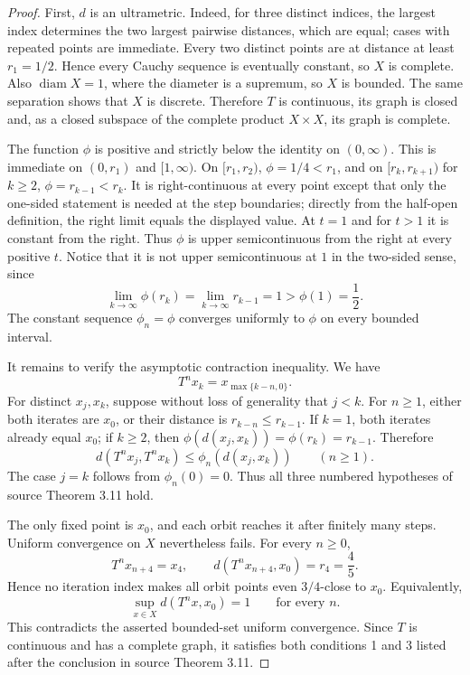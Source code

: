\documentclass[11pt]{article}
\begin{document}
\begin{proof}
First, $d$ is an ultrametric.  Indeed, for three distinct indices, the largest
index determines the two largest pairwise distances, which are equal; cases
with repeated points are immediate.  Every two distinct points are at
distance at least $r_1=1/2$.  Hence every Cauchy sequence is eventually
constant, so $X$ is complete.  Also $\operatorname{diam}X=1$, where the
diameter is a supremum, so $X$ is bounded.  The same separation shows that
$X$ is discrete.  Therefore $T$ is continuous, its graph is closed and,
as a closed subspace of the complete product $X\times X$, its graph is
complete.

The function $\phi$ is positive and strictly below the identity on
$(0,\infty)$.  This is immediate on $(0,r_1)$ and $[1,\infty)$.  On
$[r_1,r_2)$, $\phi=1/4<r_1$, and on
$[r_k,r_{k+1})$ for $k\geq2$, $\phi=r_{k-1}<r_k$.
It is right-continuous at every point except that only the one-sided statement
is needed at the step boundaries; directly from the half-open definition,
the right limit equals the displayed value.  At $t=1$ and for $t>1$ it is
constant from the right.  Thus $\phi$ is upper semicontinuous from the right
at every positive $t$.  Notice that it is not upper semicontinuous at $1$ in
the two-sided sense, since
\[
 \lim_{k\to\infty}\phi(r_k)
 =\lim_{k\to\infty}r_{k-1}=1>\phi(1)=\frac12.
\]
The constant sequence $\phi_n=\phi$ converges uniformly to $\phi$ on every
bounded interval.

It remains to verify the asymptotic contraction inequality.  We have
\[
 T^n x_k=x_{\max\{k-n,0\}}.
\]
For distinct $x_j,x_k$, suppose without loss of generality that $j<k$.
For $n\geq1$, either both iterates are $x_0$, or their distance is
$r_{k-n}\leq r_{k-1}$.  If $k=1$, both iterates already equal $x_0$;
if $k\geq2$, then $\phi(d(x_j,x_k))=\phi(r_k)=r_{k-1}$.  Therefore
\[
 d(T^n x_j,T^n x_k)\leq\phi_n(d(x_j,x_k))
 \qquad(n\geq1).
\]
The case $j=k$ follows from $\phi_n(0)=0$.  Thus all three numbered
hypotheses of source Theorem 3.11 hold.

The only fixed point is $x_0$, and each orbit reaches it after finitely many
steps.  Uniform convergence on $X$ nevertheless fails.  For every $n\geq0$,
\[
 T^n x_{n+4}=x_4,
 \qquad d(T^n x_{n+4},x_0)=r_4=\frac45.
\]
Hence no iteration index makes all orbit points even $3/4$-close to $x_0$.
Equivalently,
\[
 \sup_{x\in X}d(T^n x,x_0)=1
 \qquad\text{for every }n.
\]
This contradicts the asserted bounded-set uniform convergence.  Since $T$
is continuous and has a complete graph, it satisfies both conditions 1 and 3
listed after the conclusion in source Theorem 3.11.
\end{proof}
\end{document}

